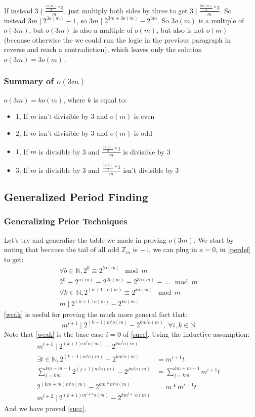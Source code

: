 \documentclass{article}
\begin{document}
  If instead $3\nmid \frac{\frac{o(m)}{2} * 3}{m}$, just multiply both sides by three to get $3 \mid \frac{\frac{3o(m)}{2} * 3}{m}$. So instead $3m \mid 2^{3o(m)} - 1$, so $3m \mid 2^{3m+3o(m)} - 2^{3m}$. So $3o(m)$ is a multiple of $o(3m)$, but $o(3m)$ is also a multiple of $o(m)$, but also is not $o(m)$ (because otherwise the we could run the logic in the previous paragraph in reverse and reach a contradiction), which leaves only the solution $o(3m) = 3o(m)$.
  \subsubsection{Summary of $o(3m)$}
  $o(3m) = ko(m)$, where $k$ is equal to:
  \begin{itemize}
  \item $1$, If $m$ isn't divisible by 3 and $o(m)$ is even
  \item $2$, If $m$ isn't divisible by 3 and $o(m)$ is odd
  \item $1$, If $m$ is divisible by 3 and $\frac{\frac{o(m)}{2} * 3}{m}$ is divisible by 3
  \item $3$, If $m$ is divisible by 3 and $\frac{\frac{o(m)}{2} * 3}{m}$ isn't divisible by 3
  \end{itemize}
  \subsection{Generalized Period Finding}
  \subsubsection{Generalizing Prior Techniques}
  Let's try and generalize the table we made in proving $o(3m)$. We start by noting that because the tail of all odd $\mathbb{Z}_m$ is $-1$, we can plug in $a=0$, in  \eqref{perdef} to get:
  \begin{align}
    \forall b \in \mathbb{N}, 2^{0} \equiv 2^{bo(m)} \mod m\\
    2^0 \equiv 2^{o(m)} \equiv 2^{2o(m)}\equiv 2^{3o(m)} \equiv ... \mod m\\
    \forall k \in \mathbb{N}, 2^{(k+1)o(m)} \equiv 2^{ko(m)} \mod m\\
    m \mid 2^{(k+1)o(m)} - 2^{ko(m)} \label{weak}
  \end{align}
  \eqref{weak} is useful for proving the much more general fact that:
  \begin{equation}\label{succ}
    m^{i+1} \mid 2^{(k+1)m^io(m)} - 2^{km^io(m)},\  \forall i, k \in \mathbb{N}
  \end{equation}
  Note that \eqref{weak} is the base case $i=0$ of \eqref{succ}. Using the inductive assumption:
  \begin{align}
    m^{i+1} \mid 2^{(k+1)m^io(m)} - 2^{km^io(m)}\\
    \exists t \in \mathbb{N}, 2^{(k+1)m^io(m)} - 2^{km^io(m)} &= m^{i+1}t\\
    \sum^{km+m-1}_{j=km}2^{(j+1)m^io(m)} - 2^{jm^io(m)} &= \sum^{km+m-1}_{j=km}m^{i+1}t\\
    2^{(km+m)m^io(m)} - 2^{km*m^{i}o(m)} &= m * m^{i+1}t\\
    m^{i+2} \mid 2^{(k+1)m^{i+1}o(m)} - 2^{km^{i+1}o(m)} 
  \end{align}
  And we have proved \eqref{succ}.
\end{document}
